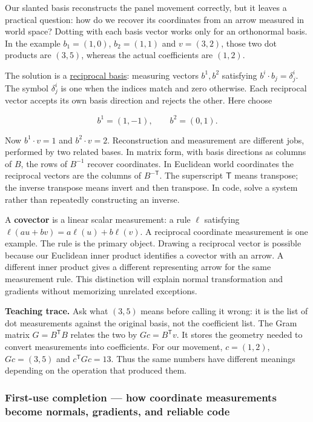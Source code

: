 Our slanted basis reconstructs the panel movement correctly, but it leaves a practical question: how do we recover its coordinates from an arrow measured in world space? Dotting with each basis vector works only for an orthonormal basis. In the example \(b_1=(1,0)\), \(b_2=(1,1)\) and \(v=(3,2)\), those two dot products are \((3,5)\), whereas the actual coefficients are \((1,2)\).

The solution is a \hyperref[appendix-6b3d696dd902]{reciprocal basis}: measuring vectors \(b^1,b^2\) satisfying \(b^i\cdot b_j=\delta^i_j\). The symbol \(\delta^i_j\) is one when the indices match and zero otherwise. Each reciprocal vector accepts its own basis direction and rejects the other. Here choose

\[
b^1=(1,-1),\qquad b^2=(0,1).
\]

Now \(b^1\cdot v=1\) and \(b^2\cdot v=2\). Reconstruction and measurement are different jobs, performed by two related bases. In matrix form, with basis directions as columns of \(B\), the rows of \(B^{-1}\) recover coordinates. In Euclidean world coordinates the reciprocal vectors are the columns of \(B^{-\mathsf T}\). The superscript \(\mathsf T\) means transpose; the inverse transpose means invert and then transpose. In code, solve a system rather than repeatedly constructing an inverse.

A \textbf{covector} is a linear scalar measurement: a rule \(\ell\) satisfying \(\ell(au+bv)=a\ell(u)+b\ell(v)\). A reciprocal coordinate measurement is one example. The rule is the primary object. Drawing a reciprocal vector is possible because our Euclidean inner product identifies a covector with an arrow. A different inner product gives a different representing arrow for the same measurement rule. This distinction will explain normal transformation and gradients without memorizing unrelated exceptions.

\textbf{Teaching trace.} Ask what \((3,5)\) means before calling it wrong: it is the list of dot measurements against the original basis, not the coefficient list. The Gram matrix \(G=B^{\mathsf T}B\) relates the two by \(Gc=B^{\mathsf T}v\). It stores the geometry needed to convert measurements into coefficients. For our movement, \(c=(1,2)\), \(Gc=(3,5)\) and \(c^{\mathsf T}Gc=13\). Thus the same numbers have different meanings depending on the operation that produced them.

\subsubsection{First-use completion --- how coordinate measurements become normals, gradients, and reliable code}\label{01-foundations-i-ch017-first-use-completion-how-coordinate-measurements-become-normals-gradients-and-reliable-code}

